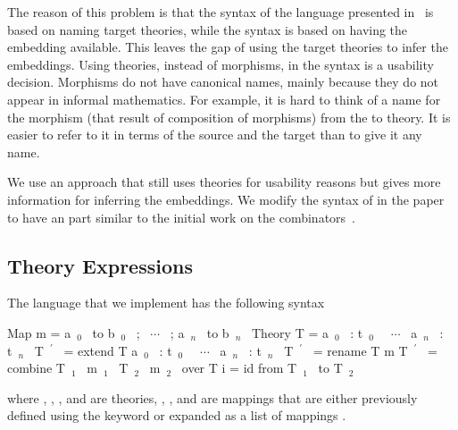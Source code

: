 The reason of this problem is that the syntax of the language presented in~\cite{carette2018building} is based on naming target theories, while the syntax is based on having the embedding available. This leaves the gap of using the target theories to infer the embeddings. Using theories, instead of morphisms, in the syntax is a usability decision. Morphisms do not have canonical names, mainly because they do not appear in informal mathematics. For example, it is hard to think of a name for the morphism (that result of composition of morphisms) from the  to  theory. It is easier to refer to it in terms of the source and the target than to give it any name. 

We use an approach that still uses theories for usability reasons but gives more information for inferring the embeddings. We modify the syntax of  in the paper to have an  part similar to the initial work on the combinators~\cite{CaretteOConnorTPC}. 

\begin{comment}
\subsubsection{All Paths Commute Approach} 
\ednote{@JC: Do we need to remove mixin, so all paths commute?} 
When referring to a morphism using its source and target, we implicitly assume that all paths commute, i.e.: Given the source and target, they either is no path, one path, or multiple paths that commute between them. 

In Section~\ref{sec:background:morphisms}, we discussed the three types of morphisms, identity, embeddings and general morphisms. We also noted in Section~\ref{subsec:mixin} that the only combinator that accepts and generates a general morphism is \lstmath{mixin}. If we restrict our language to \lstmath{extension}, \lstmath{rename}, and \lstmath{combine}, we end up with an all-embeddings graph, in which all paths commute. 
\end{comment}

\subsection{Theory Expressions}
\label{sec:impl:expressions}
The language that we implement has the following syntax
\begin{togcode}
 Map m = {a~$_0$~ to b~$_0$~ ; ~$\cdots$~ ; a~$_n$~ to b~$_n$~}
 Theory T = {a~$_0$~ : t~$_0$~ ~$\cdots$~ a~$_n$~ : t~$_n$~}
 T~$^\prime$~ = extend T {a~$_0$~ : t~$_0$~ ~$\cdots$~ a~$_n$~ : t~$_n$~}
 T~$^\prime$~ = rename T m 
 T~$^\prime$~ = combine T~$_1$~ m~$_1$~ T~$_2$~ m~$_2$~ over T
 i = id from T~$_1$~ to T~$_2$~
\end{togcode} 
\noindent where , , , and  are theories, , , and  are mappings that are either previously defined using the  keyword or expanded as a list of mappings 
. 

